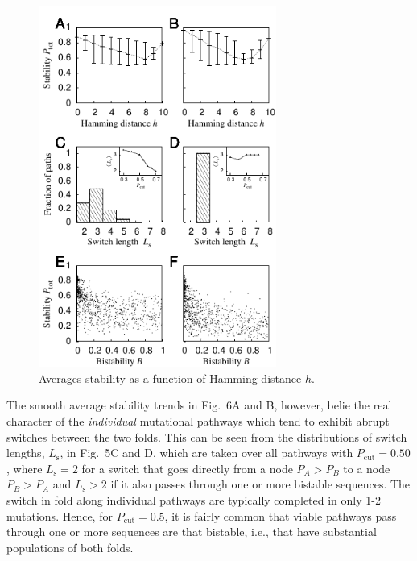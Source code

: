\documentclass[%
 aip,
rsi,%
 amsmath,amssymb,
 reprint,%
]{revtex4-1}
\newcommand {\Pcut}     	{{P_\mathrm{cut}}}
\newcommand {\Ptot}	{{P_\mathrm{tot}}}
\newcommand {\PaI}    	{{P_\mathrm{IA}}}
\newcommand {\PaII}    	{{P_\mathrm{IIA}}}
\begin{document}
\begin{figure}
\includegraphics[width=7.8cm]{Paths}
\caption{Averages stability as a function of Hamming distance $h$. }
\end{figure}


The smooth average stability trends in Fig.~6A and B, however, belie the real character of the \textit{individual} mutational pathways which tend to exhibit abrupt switches between the two folds. 
This can be seen from the distributions of switch lengths, $L_\mathrm{s}$, in Fig.~5C and D, which are taken over all pathways with $\Pcut=0.50$,
where  $L_\mathrm{s} = 2$ for a switch that goes directly from a node $P_A>P_B$ to a node $P_B>P_A$ and $L_\mathrm{s} > 2$ if it also passes through one or more bistable sequences. The switch in fold along individual pathways are typically completed in only 1-2 mutations. Hence, for $\Pcut = 0.5$, it is fairly common that viable pathways pass through one or more sequences are that bistable, i.e., that have substantial populations of both folds. 
\end{document}
